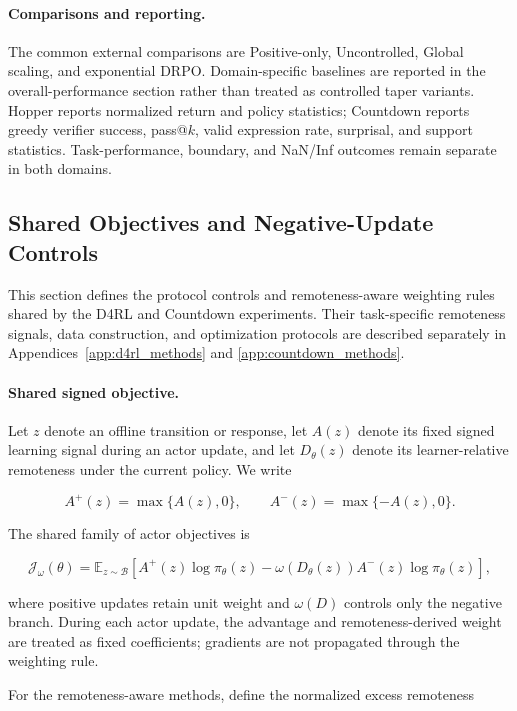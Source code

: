 \paragraph{Comparisons and reporting.}
The common external comparisons are Positive-only, Uncontrolled,
Global scaling, and exponential DRPO. Domain-specific baselines are
reported in the overall-performance section rather than treated as
controlled taper variants. Hopper reports normalized return and policy
statistics; Countdown reports greedy verifier success, pass@$k$, valid
expression rate, surprisal, and support statistics. Task-performance,
boundary, and NaN/Inf outcomes remain separate in both domains.
\subsection{Shared Objectives and Negative-Update Controls}
\label{app:shared_methods}

This section defines the protocol controls and remoteness-aware
weighting rules shared by the D4RL and Countdown experiments. Their
task-specific remoteness signals, data construction, and optimization
protocols are described separately in
Appendices~\ref{app:d4rl_methods} and
\ref{app:countdown_methods}.

\paragraph{Shared signed objective.}

Let \(z\) denote an offline transition or response, let
\(A(z)\) denote its fixed signed learning signal during an actor update,
and let \(D_\theta(z)\) denote its learner-relative remoteness under the
current policy. We write

\[
A^{+}(z)=\max\{A(z),0\},
\qquad
A^{-}(z)=\max\{-A(z),0\}.
\]

The shared family of actor objectives is

\[
\mathcal{J}_{\omega}(\theta)
=
\mathbb{E}_{z\sim\mathcal{B}}
\left[
A^{+}(z)\log \pi_\theta(z)
 -
\omega\!\left(D_\theta(z)\right)
A^{-}(z)\log \pi_\theta(z)
\right],
\]

where positive updates retain unit weight and
\(\omega(D)\) controls only the negative branch. During each actor
update, the advantage and remoteness-derived weight are treated as
fixed coefficients; gradients are not propagated through the weighting
rule.

For the remoteness-aware methods, define the normalized excess
remoteness


